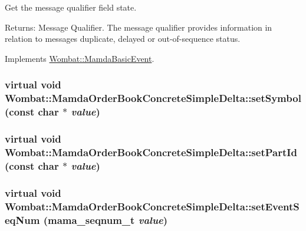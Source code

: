Get the message qualifier field state. 

\begin{Desc}
\item[Returns:]Message Qualifier. The message qualifier provides information in relation to messages duplicate, delayed or out-of-sequence status. \end{Desc}


Implements \hyperlink{classWombat_1_1MamdaBasicEvent_3454d51e1131d9949691ee4b4153cd97}{Wombat::Mamda\-Basic\-Event}.\hypertarget{classWombat_1_1MamdaOrderBookConcreteSimpleDelta_88fd4c36a2c9c25efe11595c0637caad}{
\subsubsection[setSymbol]{\setlength{\rightskip}{0pt plus 5cm}virtual void Wombat::Mamda\-Order\-Book\-Concrete\-Simple\-Delta::set\-Symbol (const char $\ast$ {\em value})}}
\label{classWombat_1_1MamdaOrderBookConcreteSimpleDelta_88fd4c36a2c9c25efe11595c0637caad}


\hypertarget{classWombat_1_1MamdaOrderBookConcreteSimpleDelta_c8dfd470646b4bfaa501a870a3c5e743}{
\subsubsection[setPartId]{\setlength{\rightskip}{0pt plus 5cm}virtual void Wombat::Mamda\-Order\-Book\-Concrete\-Simple\-Delta::set\-Part\-Id (const char $\ast$ {\em value})}}
\label{classWombat_1_1MamdaOrderBookConcreteSimpleDelta_c8dfd470646b4bfaa501a870a3c5e743}


\hypertarget{classWombat_1_1MamdaOrderBookConcreteSimpleDelta_eda7184722a14d5e1d059c8855f7a955}{
\subsubsection[setEventSeqNum]{\setlength{\rightskip}{0pt plus 5cm}virtual void Wombat::Mamda\-Order\-Book\-Concrete\-Simple\-Delta::set\-Event\-Seq\-Num (mama\_\-seqnum\_\-t {\em value})}}
\label{classWombat_1_1MamdaOrderBookConcreteSimpleDelta_eda7184722a14d5e1d059c8855f7a955}


